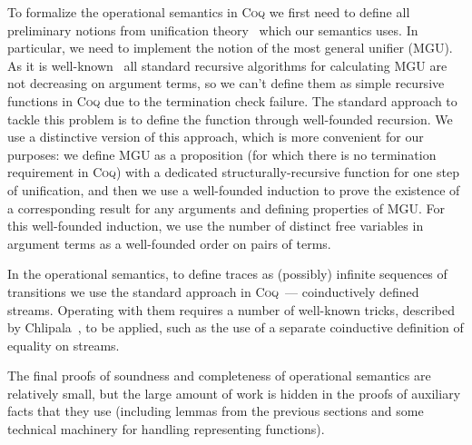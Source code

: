 To formalize the operational semantics in \textsc{Coq} we first need to define all preliminary notions from unification theory~\cite{Unification} which our semantics uses. In particular, we need to implement the notion of the most general unifier (MGU). As it is well-known~\cite{StructuralMGU} all standard recursive algorithms for calculating MGU are not decreasing on argument terms, so we can't define them as simple recursive functions in \textsc{Coq} due to the termination check failure. The standard approach to tackle this problem is to define the function through well-founded recursion. We use a distinctive version of this approach, which is more convenient for our purposes: we define MGU as a proposition (for which there is no termination requirement in \textsc{Coq}) with a dedicated structurally-recursive function for one step of unification, and then we use a well-founded induction to prove the existence of a corresponding result for any arguments and defining properties of MGU. For this well-founded induction, we use the number of distinct free variables in argument terms as a well-founded order on pairs of terms.

In the operational semantics, to define traces as (possibly) infinite sequences of transitions we use the standard approach in \textsc{Coq}~--- coinductively defined streams. Operating with them requires a number of well-known tricks, described by Chlipala~\cite{CPDT}, to be applied, such as the use of a separate coinductive definition of equality on streams.

The final proofs of soundness and completeness of operational semantics are relatively small, but the large amount of work is hidden in the proofs of auxiliary facts that they use (including lemmas from the previous sections and some technical machinery for handling representing functions).
